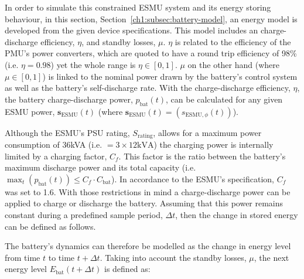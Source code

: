 In order to simulate this constrained ESMU system and its energy storing behaviour, in this section, Section~\ref{ch1:subsec:battery-model}, an energy model is developed from the given device specifications.
This model includes an charge-discharge efficiency, $\eta$, and standby losses, $\mu$.
$\eta$ is related to the efficiency of the PMU's power converters, which are quoted to have a round trip efficiency of 98\% (i.e. $\eta = 0.98$) yet the whole range is $\eta \in [0, 1]$.
$\mu$ on the other hand (where $\mu \in [0, 1]$) is linked to the nominal power drawn by the battery's control system as well as the battery's self-discharge rate.
With the charge-discharge efficiency, $\eta$, the battery charge-discharge power, $p_\text{bat}(t)$, can be calculated for any given ESMU power, $\textbf{s}_\text{ESMU}(t)$ (where $\textbf{s}_\text{ESMU}(t) = (s_{\text{ESMU},\phi}(t))$).




Although the ESMU's PSU rating, $S_\text{rating}$, allows for a maximum power consumption of 36kVA (i.e. $=3\times12\text{kVA}$) the charging power is internally limited by a charging factor, $C_f$.
This factor is the ratio between the battery's maximum discharge power and its total capacity (i.e. $\max_t (p_\text{bat}(t)) \leq C_f \cdot C_\text{bat}$).
In accordance to the ESMU's specification, $C_f$ was set to 1.6.
With those restrictions in mind a charge-discharge power can be applied to charge or discharge the battery.
Assuming that this power remains constant during a predefined sample period, $\Delta t$, then the change in stored energy can be defined as follows.



\nomenclature[I]{$\mu$}{Self-discharge losses of battery, where $\mu \in (0, 1]$}

The battery's dynamics can therefore be modelled as the change in energy level from time $t$ to time $t+\Delta t$.
Taking into account the standby losses, $\mu$, the next energy level $E_\text{bat}(t+\Delta t)$ is defined as:



